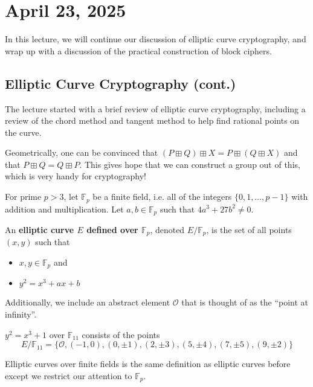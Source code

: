\section{April 23, 2025}
\label{20250423}

In this lecture, we will continue our discussion of elliptic curve cryptography, and wrap up with a discussion of the practical construction of block ciphers.

\subsection{Elliptic Curve Cryptography (cont.)}

The lecture started with a brief review of elliptic curve cryptography, including a review of the chord method and tangent method to help find rational points on the curve.

Geometrically, one can be convinced that $(P \boxplus Q) \boxplus X = P \boxplus (Q\boxplus X)$ and that $P \boxplus Q = Q \boxplus P$. This gives hope that we can construct a group out of this, which is very handy for cryptography!

\begin{definition}
    For prime $p >3$, let $\mathbb{F}_p$ be a finite field, i.e. all of the integers $\{0, 1, \dots, p-1\}$ with addition and multiplication. Let $a, b \in \mathbb{F}_p$ such that $4a^3 + 27b^2 \neq 0$.
    
    An \textbf{elliptic curve $E$ defined over $\mathbb{F}_p$}, denoted $E / \mathbb{F}_p$, is the set of all points $(x,y)$ such that
    \begin{itemize}
        \item $x,y \in \mathbb{F}_p$ and
        \item $y^2 = x^3 + ax +b$
    \end{itemize}

    Additionally, we include an abstract element $\mathcal{O}$ that is thought of as the ``point at infinity''.
\end{definition}

\begin{example}
    $y^2 = x^3 + 1$ over $\mathbb{F}_{11}$ consists of the points
    $$E / \mathbb{F}_{11} = \{\mathcal{O}, (-1, 0), (0, \pm 1), (2, \pm 3), (5, \pm 4), (7, \pm 5), (9, \pm 2)\}$$
\end{example}

Elliptic curves over finite fields is the same definition as elliptic curves before except we restrict our attention to $\mathbb{F}_p$.

